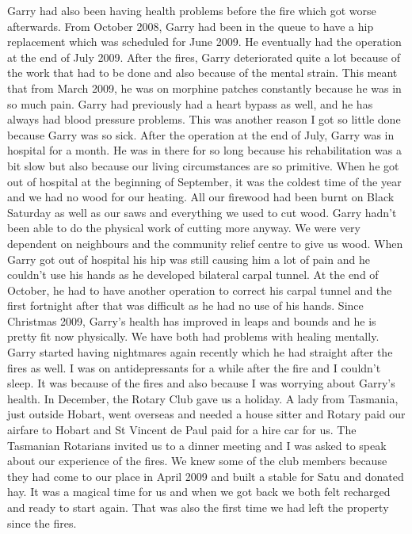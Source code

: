 \documentclass[a4paper]{article}
\begin{document}
        Garry had also been having health problems before the fire which got worse afterwards. From October 2008, Garry had been in the queue to have a hip replacement which was scheduled for June 2009. He eventually had the operation at the end of July 2009. After the fires, Garry deteriorated quite a lot because of the work that had to be done and also because of the mental strain. This meant that from March 2009, he was on morphine patches constantly because he was in so much pain. Garry had previously had a heart bypass as well, and he has always had blood pressure problems. This was another reason I got so little done because Garry was so sick.
        After the operation at the end of July, Garry was in hospital for a month. He was in there for so long because his rehabilitation was a bit slow but also because our living circumstances are so primitive. When he got out of hospital at the beginning of September, it was the coldest time of the year and we had no wood for our heating. All our firewood had been burnt on Black Saturday as well as our saws and everything we used to cut wood. Garry hadn't been able to do the physical work of cutting more anyway. We were very dependent on neighbours and the community relief centre to give us wood.
        When Garry got out of hospital his hip was still causing him a lot of pain and he couldn't use his hands as he developed bilateral carpal tunnel. At the end of October, he had to have another operation to correct his carpal tunnel and the first fortnight after that was difficult as he had no use of his hands.
        Since Christmas 2009, Garry's health has improved in leaps and bounds and he is pretty fit now physically.
        We have both had problems with healing mentally. Garry started having nightmares again recently which he had straight after the fires as well. I was on antidepressants for a while after the fire and I couldn't sleep. It was because of the fires and also because I was worrying about Garry's health.
        In December, the Rotary Club gave us a holiday. A lady from Tasmania, just outside Hobart, went overseas and needed a house sitter and Rotary paid our airfare to Hobart and St Vincent de Paul paid for a hire car for us. The Tasmanian Rotarians invited us to a dinner meeting and I was asked to speak about our experience of the fires. We knew some of the club members because they had come to our place in April 2009 and built a stable for Satu and donated hay. It was a magical time for us and when we got back we both felt recharged and ready to start again. That was also the first time we had left the property since the fires.
\end{document}

